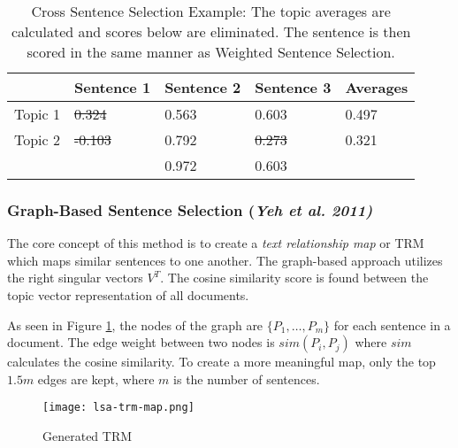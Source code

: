 \documentclass[../writeup.tex]{subfiles}
\begin{document}
\begin{table}[]
    \centering
    \begin{tabular}{ll|l|l|l}
        \hline
        \multicolumn{1}{|l|}{}        & Sentence 1  & Sentence 2                    & Sentence 3                    & \multicolumn{1}{l|}{Averages} \\ \hline
        \multicolumn{1}{|l|}{Topic 1} & \st{0.324}  & 0.563                         & \cellcolor[HTML]{FFFFFF}0.603 & \multicolumn{1}{l|}{0.497}    \\ \hline
        \multicolumn{1}{|l|}{Topic 2} & \st{-0.103} & \cellcolor[HTML]{FFFFFF}0.792 & \st{0.273}                    & \multicolumn{1}{l|}{0.321}    \\ \hline
                                      &             & \cellcolor[HTML]{F8FF00}0.972 & \cellcolor[HTML]{F8FF00}0.603 &                               \\ \cline{3-4}
    \end{tabular}
    \caption{Cross Sentence Selection Example: The topic averages are calculated and scores below are eliminated. The sentence is then scored in the same manner as Weighted Sentence Selection.}
    \label{david:table:cross}
\end{table}



\subsubsection{Graph-Based Sentence Selection (\emph{Yeh et al. 2011)}} \label{david:sec:lsa:sent-selection:graph}

The core concept of this method is to create a \emph{text relationship map} or TRM which maps similar sentences to one another.
The graph-based approach utilizes the right singular vectors $V^T$. The cosine similarity score is found between the topic vector representation of all documents.

As seen in Figure \ref{david:fig:trm-map}, the nodes of the graph are $\{P_1, \dots, P_m\}$ for each sentence in a document. The edge weight between two nodes is $sim(P_i,P_j)$ where $sim$ calculates the cosine similarity.
To create a more meaningful map, only the top $1.5m$ edges are kept, where $m$ is the number of sentences.

\begin{figure}[h]
    \centering
    \texttt{[image: lsa-trm-map.png]}
    \caption{Generated TRM}
    \label{david:fig:trm-map}
\end{figure}
\end{document}
